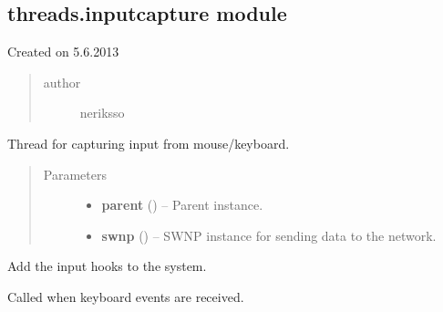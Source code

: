 \documentclass[letterpaper,10pt,english]{sphinxmanual}
\begin{document}
\subsection{threads.inputcapture module}
\label{threads:module-threads.inputcapture}\label{threads:threads-inputcapture-module}
Created on 5.6.2013
\begin{quote}\begin{description}
\item[{author}] \leavevmode
neriksso

\end{description}\end{quote}

\begin{fulllineitems}
\label{threads:threads.inputcapture.INPUT_CAPTURE}
Thread for capturing input from mouse/keyboard.
\begin{quote}\begin{description}
\item[{Parameters}] \leavevmode\begin{itemize}
\item {} 
\textbf{parent} () -- Parent instance.

\item {} 
\textbf{swnp} ({\hyperref[swnp:swnp.SWNP]{}}) -- SWNP instance for sending data to the network.

\end{itemize}

\end{description}\end{quote}

\begin{fulllineitems}
\label{threads:threads.inputcapture.INPUT_CAPTURE.hook}
Add the input hooks to the system.

\end{fulllineitems}


\begin{fulllineitems}
\label{threads:threads.inputcapture.INPUT_CAPTURE.on_keyboard_event}
Called when keyboard events are received.


\end{fulllineitems}
\end{fulllineitems}
\end{document}
